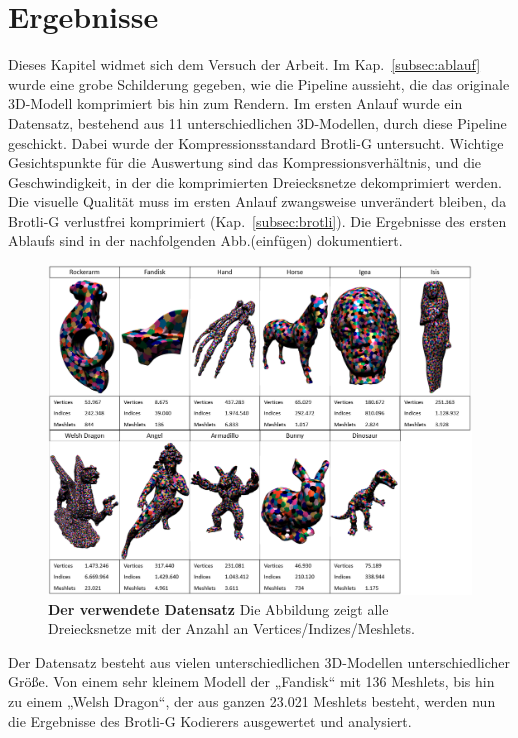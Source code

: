 \section{Ergebnisse}
\label{sec:ergebnisse}
Dieses Kapitel widmet sich dem Versuch der Arbeit. 
Im Kap.~\ref{subsec:ablauf} wurde eine grobe Schilderung gegeben, wie die Pipeline aussieht, die das originale 3D-Modell komprimiert bis hin zum Rendern.
Im ersten Anlauf wurde ein Datensatz, bestehend aus 11 unterschiedlichen 3D-Modellen, durch diese Pipeline geschickt. 
Dabei wurde der Kompressionsstandard Brotli-G untersucht. 
Wichtige Gesichtspunkte für die Auswertung sind das Kompressionsverhältnis, und die Geschwindigkeit, in der die komprimierten Dreiecksnetze dekomprimiert werden. 
Die visuelle Qualität muss im ersten Anlauf zwangsweise unverändert bleiben, da Brotli-G verlustfrei komprimiert (Kap.~\ref{subsec:brotli}). 
Die Ergebnisse des ersten Ablaufs sind in der nachfolgenden Abb.(einfügen) dokumentiert.

\begin{figure}[htb]
  \centering  
  \includegraphics[scale=0.5]{Bilder/Ergebnisse_zusammen.png}
  \caption[Der verwendete Datensatz]{\textbf{Der verwendete Datensatz} Die Abbildung zeigt alle Dreiecksnetze mit der Anzahl an Vertices/Indizes/Meshlets. }
  \label{fig:mesh_shading_pipeline}
\end{figure}

Der Datensatz besteht aus vielen unterschiedlichen 3D-Modellen unterschiedlicher Größe. 
Von einem sehr kleinem Modell der „Fandisk“ mit 136 Meshlets, bis hin zu einem „Welsh Dragon“, der aus ganzen 23.021 Meshlets besteht, werden nun die Ergebnisse des Brotli-G Kodierers ausgewertet und analysiert.

